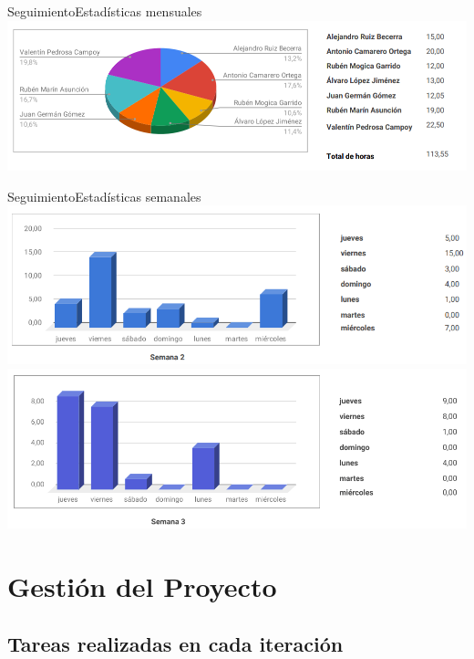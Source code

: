 \documentclass{beamer}
\begin{document}
	\begin{frame}{Seguimiento}{Estad\'isticas mensuales}
	\centering
	\includegraphics[width=0.8\paperwidth]{images_latex/seguimiento/graf_horas_1}
	\end{frame}

	\begin{frame}{Seguimiento}{Estad\'isticas semanales}
	\centering
	\includegraphics[width=0.8\paperwidth]{images_latex/seguimiento/graf_horas_2}
	\includegraphics[width=0.8\paperwidth]{images_latex/seguimiento/graf_horas_3}
	\end{frame}

\section{Gesti\'on del Proyecto}

\subsection{Tareas realizadas en cada iteraci\'on}
\end{document}
